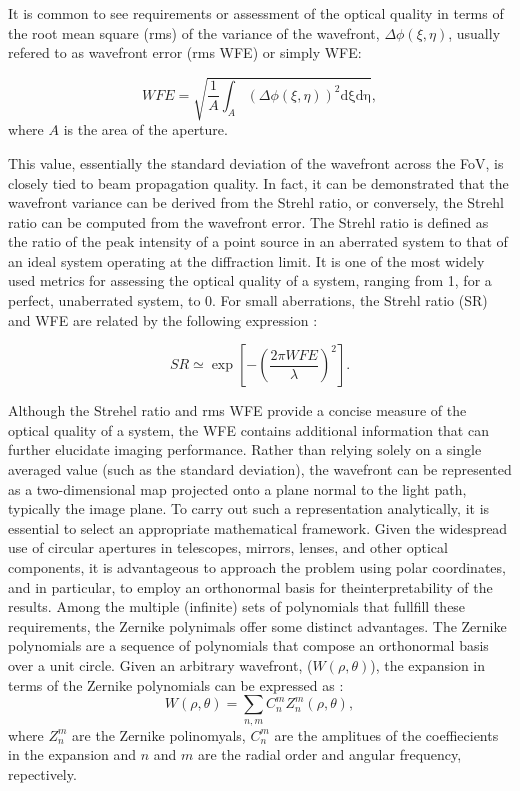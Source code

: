 It is common to see requirements or assessment of the optical quality in terms of the root mean square (rms) of the variance of the wavefront, $\Delta \phi (\xi, \eta)$, usually refered to as wavefront error (rms WFE) or simply WFE:

\begin{equation}
  WFE = \sqrt{\frac{1}{A}\int _ {A} \left( \Delta \phi (\xi, \eta) \right) ^2 \mathrm{d \xi}\mathrm{d \eta}},
\end{equation}
where $A$ is the area of the aperture. 

This value, essentially the standard deviation of the wavefront across the FoV, is closely tied to beam propagation quality. In fact, it can be demonstrated that the wavefront variance can be derived from the Strehl ratio, or conversely, the Strehl ratio can be computed from the wavefront error. The Strehl ratio is defined as the ratio of the peak intensity of a point source in an aberrated system to that of an ideal system operating at the diffraction limit. It is one of the most widely used metrics for assessing the optical quality of a system, ranging from 1, for a perfect, unaberrated system, to 0. For small aberrations, the Strehl ratio (SR) and WFE are related by the following expression \citep{WFE_def}: 

\begin{equation}
  SR \simeq \exp \left[ - \left(\frac{2\pi WFE}{\lambda}\right) ^2 \right].
\end{equation}

Although the Strehel ratio and rms WFE provide a concise measure of the optical quality of a system, the WFE contains additional information that can further elucidate imaging performance. Rather than relying solely on a single averaged value (such as the standard deviation), the wavefront can be represented as a two-dimensional map projected onto a plane normal to the light path, typically the image plane. To carry out such a representation analytically, it is essential to select an appropriate mathematical framework. Given the widespread use of circular apertures in telescopes, mirrors, lenses, and other optical components, it is advantageous to approach the problem using polar coordinates, and in particular, to employ an orthonormal basis for theinterpretability of the results. Among the multiple (infinite) sets of polynomials that fullfill these requirements, the Zernike polynimals \citep{Zernike} offer some distinct advantages. The Zernike polynomials are a sequence of polynomials that compose an orthonormal basis over a unit circle. Given an arbitrary wavefront, ($W(\rho, \theta)$), the expansion in terms of the Zernike polynomials can be expressed as \citep{Zernike_guide}:
\begin{equation}
  W(\rho, \theta) = \sum_{n, m} C _n ^m Z _ n ^m(\rho, \theta),
\end{equation}
where $Z _n ^m$ are the Zernike polinomyals, $C_n ^m$ are the amplitues of the coeffiecients in the expansion and $n$ and $m$ are the radial order and angular frequency, repectively. 

